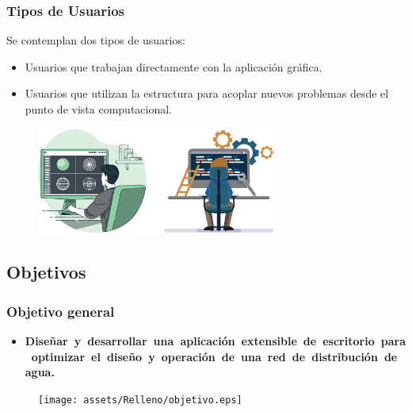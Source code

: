 \documentclass[9pt]{beamer}
\begin{document}
    \begin{frame}
        \frametitle{Tipos de Usuarios}
        
        Se contemplan dos tipos de usuarios:
        \begin{itemize}
            \item Usuarios que trabajan directamente con la aplicación gráfica.
            \item Usuarios que utilizan la estructura para acoplar nuevos problemas desde el punto de vista computacional.
        \end{itemize}

        \begin{figure}
            \includegraphics[width=0.7\textwidth]{assets/Relleno/usuarios_full.eps}
        \end{figure}
    \end{frame}

    \subsection{Objetivos}
    \begin{frame}
        \frametitle{Objetivo general}
        
        \begin{itemize}
        \justifying
            \item \textbf{Diseñar y desarrollar una aplicación extensible de escritorio para optimizar el diseño y operación de una red de distribución de agua.}
        \end{itemize}

        \begin{figure}
            \texttt{[image: assets/Relleno/objetivo.eps]}
        \end{figure}

    \end{frame}
\end{document}
